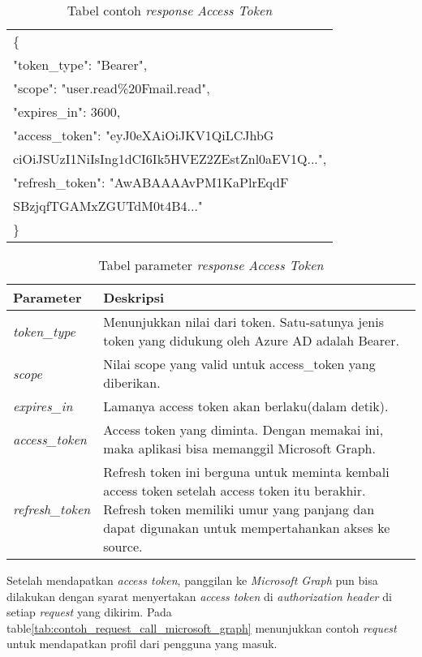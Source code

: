 \documentclass[a4paper,twoside]{article}
\begin{document}
\begin{enumerate}
\begin{table}[H]
	\centering 
	\caption{Tabel contoh \textit{response} \textit{Access Token}}
	\label{tab:contoh_response_access_token}
	\begin{tabular}{|p{9cm}|}
	\hline
	\{\\
    "token\_type": "Bearer",\\
    "scope": "user.read\%20Fmail.read",\\
    "expires\_in": 3600,\\
    "access\_token": "eyJ0eXAiOiJKV1QiLCJhbG\\
    ciOiJSUzI1NiIsIng1dCI6Ik5HVEZ2ZEstZnl0aEV1Q...",\\
    "refresh\_token": "AwABAAAAvPM1KaPlrEqdF\\
    SBzjqfTGAMxZGUTdM0t4B4..."\\
	\}\\ 
	\hline
	\end{tabular}  
\end{table}

\begin{table}[H]
	\centering 
	\caption{Tabel parameter \textit{response} \textit{Access Token}}
	\label{tab:parameter_response_access_token}
	\begin{tabular}{|p{3cm}|p{9cm}|}
	\hline
	 \textbf{Parameter} & \textbf{Deskripsi}\\ \hline 
	\textit{token\_type} & Menunjukkan nilai dari token. Satu-satunya jenis token yang didukung oleh Azure AD adalah Bearer.\\ \hline 
	\textit{scope} & Nilai scope yang valid untuk access\_token yang diberikan.  \\ \hline 
	\textit{expires\_in} & Lamanya access token akan berlaku(dalam detik). \\ \hline  
	\textit{access\_token} & Access token yang diminta. Dengan memakai ini, maka aplikasi bisa memanggil Microsoft Graph. \\ \hline 
	\textit{refresh\_token} & Refresh token ini berguna untuk meminta kembali access token setelah access token itu berakhir. Refresh token memiliki umur yang panjang dan dapat digunakan untuk mempertahankan akses ke source. \\
	\hline
	\end{tabular}  
\end{table}

Setelah mendapatkan \textit{access token}, panggilan ke \textit{Microsoft Graph} pun bisa dilakukan dengan syarat menyertakan \textit{access token} di \textit{authorization header} di setiap \textit{request} yang dikirim. Pada table\ref{tab:contoh_request_call_microsoft_graph} menunjukkan contoh \textit{request} untuk mendapatkan profil dari pengguna yang masuk. 


\end{enumerate}
\end{document}
